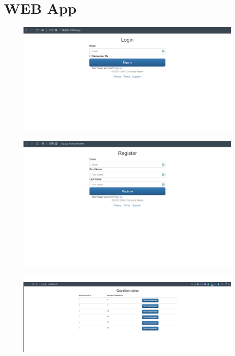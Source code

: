 \documentclass[12pt, oneside]{article}
\begin{document}
    \section{WEB App}
    \FloatBarrier
    \begin{figure}[H] 
        \centerline{
        \includegraphics[width=\textwidth]{web_login.PNG}
        }
    \end{figure}
    \FloatBarrier
    \begin{figure}[H] 
        \centerline{
        \includegraphics[width=\textwidth]{web_register.PNG}
        }
    \end{figure}
    \FloatBarrier
    \begin{figure}[H] 
        \centerline{
        \includegraphics[width=\textwidth]{web_questionnaires.PNG}
        }
    \end{figure}
\end{document}
